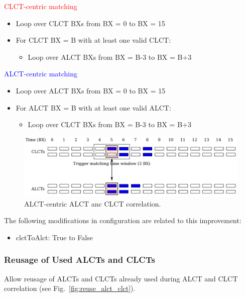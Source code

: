 \textcolor{red}{CLCT-centric matching}
\begin{itemize}
    \item Loop over CLCT BXs from BX = 0 to BX = 15
    \item For CLCT BX = B with at least one valid CLCT:
    \begin{itemize}
        \item Loop over ALCT BXs from BX = B-3 to BX = B+3
    \end{itemize}
\end{itemize}
\textcolor{blue}{ALCT-centric matching}
\begin{itemize}
    \item Loop over ALCT BXs from BX = 0 to BX = 15
    \item For ALCT BX = B with at least one valid ALCT:
    \begin{itemize}
        \item Loop over CLCT BXs from BX = B-3 to BX = B+3
    \end{itemize}
\end{itemize}

\begin{figure}[tbh]
        \begin{center}
                \includegraphics[width=0.98\linewidth]{figures/alct_clcts.pdf}
                \caption{ALCT-centric ALCT anc CLCT correlation.}
                \label{fig:alct_clcts}
        \end{center}
\end{figure}

The following modifications in configuration are related to this improvement:
\begin{itemize}
    \item clctToAlct: True to False
\end{itemize}

\subsubsection{Reusage of Used ALCTs and CLCTs}

Allow reusage of ALCTs and CLCTs already used during ALCT and CLCT correlation (see Fig.~\ref{fig:reuse_alct_clct}).

